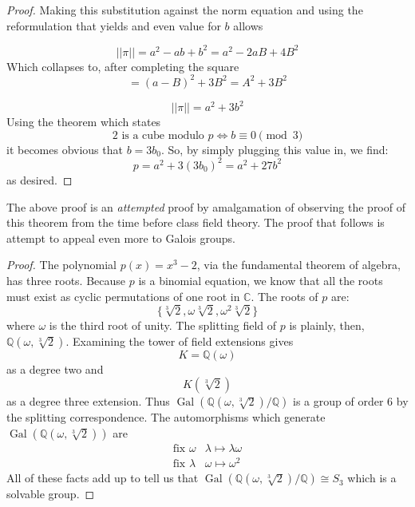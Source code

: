 \documentclass{tufte-handout}
\newcommand{\Gal}[1]{\operatorname{Gal}\left(#1\right)}
\begin{document}
\begin{proof}
  Making this substitution against the norm equation and using
  the reformulation that yields and even value for \( b \) allows

  \[
    ||\pi || = a^2 -ab + b^2 = a^2 - 2aB + 4B^2
  \]
  Which collapses to, after completing the square
  \[
    = (a-B)^2 + 3B^2 = A^2 + 3B^2
  \]

  \[||\pi||=a^2+3b^2\]
  Using the theorem
  which states
  \[2\text{ is a cube modulo }p\iff b\equiv 0\pmod{3}\]
  it becomes obvious that \(b=3b_0\). So, by simply plugging this
  value in, we find:
  \[p=a^2+3(3b_0)^2=a^2+27b^2\]
  as desired.
  \newline
\end{proof}

The above proof is an \emph{attempted} proof by amalgamation of
observing the proof of this theorem from the time before class field
theory. The proof that follows is attempt to appeal even more to Galois groups.

\begin{proof}
  The polynomial \( p(x) = x^3 - 2 \), via the fundamental theorem of
  algebra, has three roots. Because \( p \) is a binomial equation,
  we know that all the roots must exist as cyclic permutations of
  one root in \( \mathbb{C} \). The roots of \( p \) are:
  \[
    \{ \sqrt[3]{2}, \omega\sqrt[3]{2}, \omega^2\sqrt[3]{2} \}
  \]
  where \( \omega \) is the third root of unity. The splitting field of \( p \) is plainly, then, \(
  \mathbb{Q}(\omega, \sqrt[3]{2}) \). Examining the tower of field
  extensions gives
  \[
    K=\mathbb{Q}(\omega)
  \]
  as a degree two and
  \[
    K(\sqrt[3]{2})
  \]
  as a degree three extension. Thus \( \Gal{\mathbb{Q}(\omega,
  \sqrt[3]{2}) / \mathbb{Q}} \) is a group of order 6 by the splitting
  correspondence. The automorphisms which generate \(
  \Gal{\mathbb{Q}(\omega, \sqrt[3]{2})} \) are
  \[
    \begin{matrix}
      \text{fix }\omega & \lambda \mapsto \lambda\omega \\
      \text{fix }\lambda & \omega\mapsto\omega^2
    \end{matrix}
  \]
  All of these facts add up to tell us that \(
  \Gal{\mathbb{Q}(\omega, \sqrt[3]{2}) / \mathbb{Q}} \cong S_3 \)
  which is a solvable group.
\end{proof}


\end{document}
